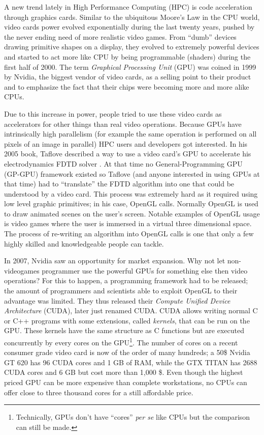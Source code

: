A new trend lately in High Performance Computing (HPC) is code acceleration
through graphics cards. Similar to the ubiquitous Moore's Law in the CPU world,
video cards power evolved exponentially during the last twenty years, pushed
by the never ending need of more realistic video games. From ``dumb'' devices
drawing primitive shapes on a display, they evolved to extremely powerful
devices and started to act more like CPU by being programmable (shaders) during
the first half of 2000. The term \textit{Graphical Processing Unit} (GPU) was
coined in 1999 by Nvidia, the biggest vendor of video cards, as a selling point
to their product and to emphasize the fact that their chips were becoming more
and more alike CPUs.

Due to this increase in power, people tried to use these video cards as
accelerators for other things than real video operations. Because GPUs have
intrinsically high parallelism (for example the same operation is performed on
all pixels of an image in parallel) HPC users and developers got interested.
In his 2005 book, Taflove described a way to use a video card's GPU to
accelerate his electrodynamics FDTD solver \cite{Taflove2005}. At that time no
General-Programming GPU (GP-GPU) framework existed so Taflove (and anyone
interested in using GPUs at that time) had to ``translate'' the FDTD algorithm
into one that could be understood by a video card. This process was extremely
hard as it required using low level graphic primitives; in his case, OpenGL
calls. Normally OpenGL is used to draw animated scenes on the user's screen.
Notable examples of OpenGL usage is video games where the user is immersed in a
virtual three dimensional space. The process of re-writing an algorithm into
OpenGL calls is one that only a few highly skilled and knowledgeable people can
tackle.

In 2007, Nvidia saw an opportunity for market expansion. Why not let
non-videogames programmer use the powerful GPUs for something else then video
operations? For this to happen, a programming framework had to be released; the
amount of programmers and scientists able to exploit OpenGL to their advantage
was limited. They thus released their \textit{Compute Unified Device
Architecture} (CUDA), later just renamed CUDA. CUDA allows writing normal C or
C++ programs with some extensions, called \textit{kernels}, that can be run on
the GPU. These kernels have the same structure as C functions but are executed
concurrently by every cores on the GPU\footnote{Technically, GPUs don't have
``cores'' \textit{per se} like CPUs but the comparison can still be made.}. The
number of cores on a recent consumer grade video card is now of the order of
many hundreds; a 50\$ Nvidia GT 620 has 96 CUDA cores and 1 GB of RAM, while the
GTX TITAN has 2688 CUDA cores and 6 GB but cost more than 1,000 \$. Even though
the highest priced GPU can be more expensive than complete workstations, no CPUs
can offer close to three thousand cores for a still affordable price.

